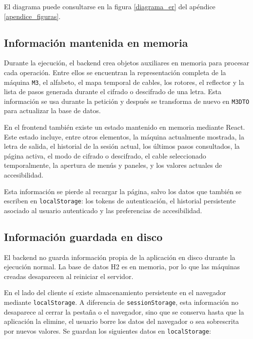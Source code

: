 El diagrama puede consultarse en la figura \ref{diagrama_er} del apéndice \ref{apendice_figuras}.


\subsection{Información mantenida en memoria}

Durante la ejecución, el backend crea objetos auxiliares en memoria para procesar cada operación. Entre ellos se encuentran la representación completa de la máquina \texttt{M3}, el alfabeto, el mapa temporal de cables, los rotores, el reflector y la lista de pasos generada durante el cifrado o descifrado de una letra. Esta información se usa durante la petición y después se transforma de nuevo en \texttt{M3DTO} para actualizar la base de datos.

En el frontend también existe un estado mantenido en memoria mediante React. Este estado incluye, entre otros elementos, la máquina actualmente mostrada, la letra de salida, el historial de la sesión actual, los últimos pasos consultados, la página activa, el modo de cifrado o descifrado, el cable seleccionado temporalmente, la apertura de menús y paneles, y los valores actuales de accesibilidad.

Esta información se pierde al recargar la página, salvo los datos que también se escriben en \texttt{localStorage}: los tokens de autenticación, el historial persistente asociado al usuario autenticado y las preferencias de accesibilidad.

\subsection{Información guardada en disco}

El backend no guarda información propia de la aplicación en disco durante la ejecución normal. La base de datos H2 es en memoria, por lo que las máquinas creadas desaparecen al reiniciar el servidor.

En el lado del cliente sí existe almacenamiento persistente en el navegador mediante \texttt{localStorage}. A diferencia de \texttt{sessionStorage}, esta información no desaparece al cerrar la pestaña o el navegador, sino que se conserva hasta que la aplicación la elimine, el usuario borre los datos del navegador o sea sobrescrita por nuevos valores. Se guardan los siguientes datos en \texttt{localStorage}:

